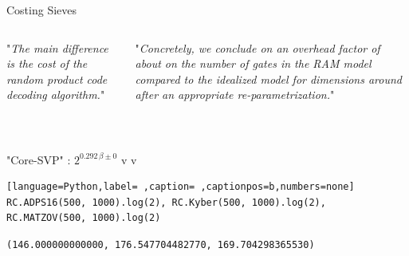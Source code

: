 \documentclass[table,10pt,aspectratio=169]{beamer}
\begin{document}
\begin{frame}[label={sec:orgf85fb9f},fragile]{Costing Sieves}
 \begin{columns}[t]
\begin{column}{0.5\columnwidth}
"\emph{The main difference is the cost of the random product code decoding algorithm.}"

\ \\
\scriptsize

\end{column}

\begin{column}{0.5\columnwidth}
"\emph{Concretely, we conclude on an overhead factor of about  on the number of gates in the RAM model compared to the idealized model for dimensions around  after an appropriate re-parametrization.}"

\ \\
\scriptsize

\end{column}
\end{columns}

"Core-SVP" \cite{USENIX:ADPS16}: \(2^{0.292\,\beta \pm 0}\) v \cite{NISTPQC-R3:CRYSTALS-KYBER20,AC:AGPS20} v \cite{Matzov22}

\begin{lstlisting}[language=Python,label= ,caption= ,captionpos=b,numbers=none]
RC.ADPS16(500, 1000).log(2), RC.Kyber(500, 1000).log(2), RC.MATZOV(500, 1000).log(2)
\end{lstlisting}

\begin{verbatim}
(146.000000000000, 176.547704482770, 169.704298365530)
\end{verbatim}
\end{frame}
\end{document}
